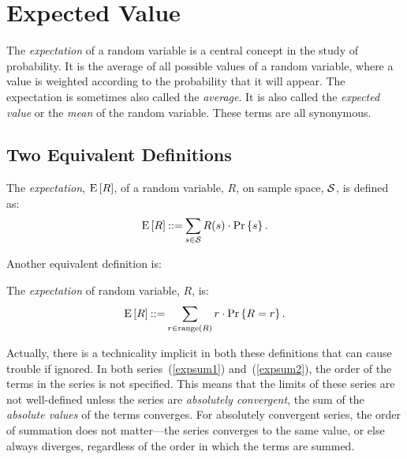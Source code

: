 \documentclass[11pt,twoside]{article}
\begin{document}
\section{Expected Value}

The \emph{expectation} of a random variable is a central concept in the
study of probability.  It is the average of all possible values of a
random variable, where a value is weighted according to the probability
that it will appear.  The expectation is sometimes also called the
\emph{average}.  It is also called the \emph{expected value} or the
\emph{mean} of the random variable.  These terms are all synonymous.

\subsection{Two Equivalent Definitions}

\begin{definition}\label{defexp1}
The \emph{expectation}, $\mathop{\textup{E}}\nolimits\left[R\right]$, of a random variable, $R$, on sample
space, $\mathcal{S}$, is defined as:
\begin{equation}\label{expsum1}
\mathop{\textup{E}}\nolimits\left[R\right] \mathbin{::=} \sum_{s \in \mathcal{S}} R(s) \cdot \mathop{\textup{Pr}}\nolimits\left\{s\right\}.
\end{equation}
\end{definition}

Another equivalent definition is:
\begin{definition}\label{defexp2}
The \emph{expectation} of random variable, $R$, is:
\begin{equation}\label{expsum2}
\mathop{\textup{E}}\nolimits\left[R\right] \mathbin{::=} \sum_{r \in \mathop{\textup{range}}\nolimits\left(R\right)} r \cdot \mathop{\textup{Pr}}\nolimits\left\{R = r\right\}.
\end{equation}
\end{definition}

Actually, there is a technicality implicit in both these definitions that
can cause trouble if ignored.  In both series~(\ref{expsum1})
and~(\ref{expsum2}), the order of the terms in the series is not
specified.  This means that the limits of these series are not
well-defined unless the series are \emph{absolutely convergent}, \ie the
sum of the \emph{absolute values} of the terms converges.  For absolutely
convergent series, the order of summation does not matter---the series
converges to the same value, or else always diverges, regardless of the
order in which the terms are summed.
\end{document}

